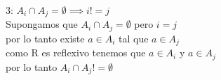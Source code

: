 \documentclass[10pt,a4paper]{article} %
\begin{document}
        \item {3: $ A_i \cap A_j = \emptyset \implies i != j  $ }
            \\ 
            Supongamos que $ A_i \cap A_j = \emptyset   $ pero $ i = j  $  
            \\ por lo tanto existe $ a \in A_i  $  tal que $ a \in  A_j  $ 
            \\ como R es reflexivo tenemos que $ a \in  A_i  $ y $ a \in A_j  $ 
            \\ por lo tanto $ A_i \cap A_j != \emptyset  $  
        
        
        
    
    







    
    \nocite{*}
    
    
\end{document}
